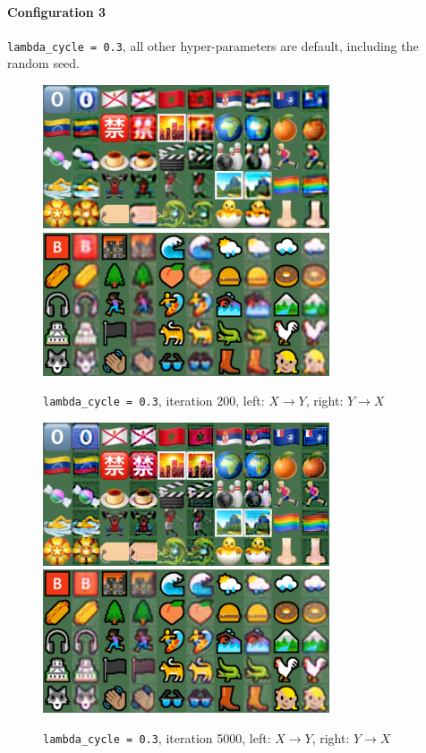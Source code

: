 \documentclass{article}
\begin{document}
	\paragraph{Configuration 3} \texttt{lambda\_cycle = 0.3}, all other hyper-parameters are default, including the random seed.
	\begin{figure}[H]
		\centering
		\caption{ \texttt{lambda\_cycle = 0.3}, iteration 200, left: $X \to Y$, right: $Y \to X$}
		\includegraphics[width=0.45\linewidth]{./samples_cyclegan_Q3_lambda0_3/sample-000200-X-Y.png}
		\includegraphics[width=0.45\linewidth]{./samples_cyclegan_Q3_lambda0_3/sample-000200-Y-X.png}
	\end{figure}
	\begin{figure}[H]
		\centering
		\caption{ \texttt{lambda\_cycle = 0.3}, iteration 5000, left: $X \to Y$, right: $Y \to X$}
		\includegraphics[width=0.45\linewidth]{./samples_cyclegan_Q3_lambda0_3/sample-005000-X-Y.png}
		\includegraphics[width=0.45\linewidth]{./samples_cyclegan_Q3_lambda0_3/sample-005000-Y-X.png}
	\end{figure}
\end{document}
